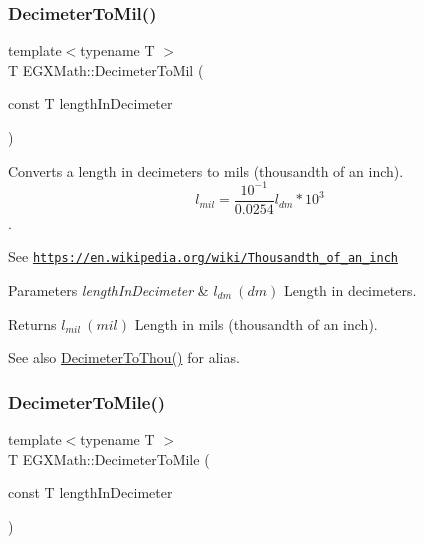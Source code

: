 \subsubsection{\texorpdfstring{Decimeter\+To\+Mil()}{DecimeterToMil()}}
{\footnotesize\ttfamily template$<$typename T $>$ \\
T E\+G\+X\+Math\+::\+Decimeter\+To\+Mil (\begin{DoxyParamCaption}\item[{const T}]{length\+In\+Decimeter }\end{DoxyParamCaption})}



Converts a length in decimeters to mils (thousandth of an inch). \[ l_{mil}= \frac{10^{-1}}{0.0254} l_{dm} * 10^{3} \]. 

See \href{https://en.wikipedia.org/wiki/Thousandth_of_an_inch}{\tt https\+://en.\+wikipedia.\+org/wiki/\+Thousandth\+\_\+of\+\_\+an\+\_\+inch} 
\begin{DoxyParams}{Parameters}
{\em length\+In\+Decimeter} & $ l_{dm}\ (dm)$ Length in decimeters. \\
\hline
\end{DoxyParams}
\begin{DoxyReturn}{Returns}
$ l_{mil}\ (mil)$ Length in mils (thousandth of an inch). 
\end{DoxyReturn}
\begin{DoxySeeAlso}{See also}
\mbox{\hyperlink{group___e_g_x_math-_conversions-_length_conversions-_s_i-_decimeter-_imperial_gafc294e549fcdd1c43545ca9624abcafb}{Decimeter\+To\+Thou()}} for alias. 
\end{DoxySeeAlso}
\mbox{\label{group___e_g_x_math-_conversions-_length_conversions-_s_i-_decimeter-_imperial_gab7d9d207fb6aa53999300baf5d9cea16}} 
\subsubsection{\texorpdfstring{Decimeter\+To\+Mile()}{DecimeterToMile()}}
{\footnotesize\ttfamily template$<$typename T $>$ \\
T E\+G\+X\+Math\+::\+Decimeter\+To\+Mile (\begin{DoxyParamCaption}\item[{const T}]{length\+In\+Decimeter }\end{DoxyParamCaption})}



